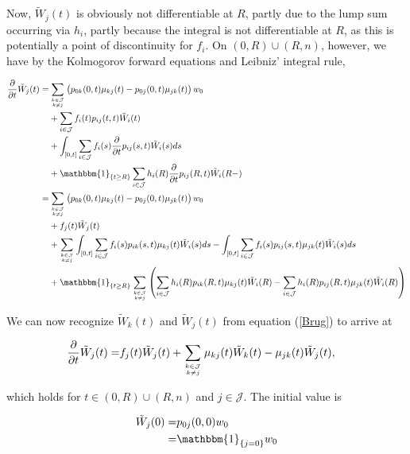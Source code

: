 \documentclass{book}
\newcommand{\1}[1]{\mathbbm{1}_{\left\lbrace #1 \right\rbrace}}
\theoremstyle{break}
\theoremstyle{remark}
\numberwithin{equation}{section}
\begin{document}
Now, $\tilde{W}_j(t)$ is obviously not differentiable at $R$, partly due to the lump sum occurring via $h_i$, partly because the integral is not differentiable at $R$, as this is potentially a point of discontinuity for $f_i$. On $(0,R)\cup(R,n)$, however, we have by the Kolmogorov forward equations and Leibniz' integral rule,

\begin{align*}
	\frac{\partial}{\partial t} \tilde{W}_j(t) =&\sum_{k \in \mathcal{J} \atop k \neq j} \left(p_{0k}(0,t) \mu_{kj}(t) - p_{0j}(0,t) \mu_{jk}(t) \right) w_0 \\
	&+ \sum_{i \in \mathcal{J}} f_i(t) p_{ij}(t,t) \tilde{W}_i(t) \\
	&+ \int_{\left[ 0,t \right]} \sum_{i \in \mathcal{J}} f_{i}(s) \frac{\partial}{\partial t} p_{ij}(s,t) \tilde{W}_i(s) ds \\
	&+ \1{t \geq R} \sum_{i \in \mathcal{J}} h_{i}(R) \frac{\partial}{\partial t} p_{ij}(R,t) \tilde{W}_i(R-) \\
	=& \sum_{k \in \mathcal{J} \atop k \neq j} \left(p_{0k}(0,t) \mu_{kj}(t) - p_{0j}(0,t) \mu_{jk}(t) \right) w_0 \\
	&+ f_j(t) \tilde{W}_j(t) \\
	&+ \sum_{k \in \mathcal{J} \atop k \neq j} \int_{\left[ 0,t \right]} \sum_{i \in \mathcal{J}} f_{i}(s) p_{ik}(s,t) \mu_{kj}(t) \tilde{W}_i(s) ds - \int_{\left[ 0,t \right]} \sum_{i \in \mathcal{J}} f_{i}(s) p_{ij}(s,t) \mu_{jk}(t) \tilde{W}_i(s) ds \\
	&+ \1{t \geq R} \sum_{k \in \mathcal{J} \atop k \neq j} \left( \sum_{i \in \mathcal{J}} h_{i}(R) p_{ik}(R,t) \mu_{kj}(t) \tilde{W}_i(R) - \sum_{i \in \mathcal{J}} h_{i}(R) p_{ij}(R,t) \mu_{jk}(t) \tilde{W}_i(R) \right) \\
\end{align*}

We can now recognize $\tilde{W}_k(t)$ and $\tilde{W}_j(t)$ from equation (\ref{Brug}) to arrive at

\begin{align*}
	\frac{\partial}{\partial t} \tilde{W}_j(t) =& f_j(t) \tilde{W}_j(t) + \sum_{k \in \mathcal{J} \atop k \neq j} \mu_{kj}(t) \tilde{W}_k(t) - \mu_{jk}(t) \tilde{W}_j(t),
\end{align*}

which holds for $t \in (0,R)\cup(R,n)$ and $j \in \mathcal{J}$. The initial value is

\begin{align*}
	\tilde{W}_j(0) =& p_{0j}(0,0) w_0 \\
	=& \1{j=0} w_0
\end{align*}
\end{document}
